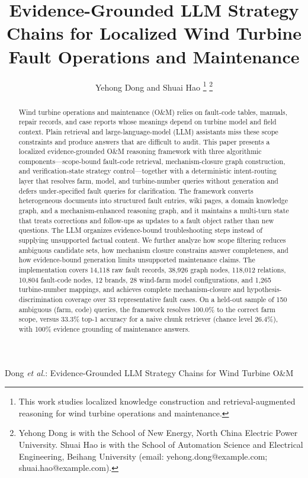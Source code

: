 \documentclass[lettersize,journal]{IEEEtran}
\begin{document}
\title{Evidence-Grounded LLM Strategy Chains for Localized Wind Turbine Fault Operations and Maintenance}

\author{Yehong Dong
        and Shuai Hao
\thanks{This work studies localized knowledge construction and retrieval-augmented reasoning for wind turbine operations and maintenance.}
\thanks{Yehong Dong is with the School of New Energy, North China Electric Power University. Shuai Hao is with the School of Automation Science and Electrical Engineering, Beihang University (email: yehong.dong@example.com; shuai.hao@example.com).}}

%
{Dong \MakeLowercase{\textit{et al.}}: Evidence-Grounded LLM Strategy Chains for Wind Turbine O\&M}

\maketitle

\begin{abstract}
Wind turbine operations and maintenance (O\&M) relies on fault-code tables, manuals, repair records, and case reports whose meanings depend on turbine model and field context. Plain retrieval and large-language-model (LLM) assistants miss these scope constraints and produce answers that are difficult to audit. This paper presents a localized evidence-grounded O\&M reasoning framework with three algorithmic components---scope-bound fault-code retrieval, mechanism-closure graph construction, and verification-state strategy control---together with a deterministic intent-routing layer that resolves farm, model, and turbine-number queries without generation and defers under-specified fault queries for clarification. The framework converts heterogeneous documents into structured fault entries, wiki pages, a domain knowledge graph, and a mechanism-enhanced reasoning graph, and it maintains a multi-turn state that treats corrections and follow-ups as updates to a fault object rather than new questions. The LLM organizes evidence-bound troubleshooting steps instead of supplying unsupported factual content. We further analyze how scope filtering reduces ambiguous candidate sets, how mechanism closure constrains answer completeness, and how evidence-bound generation limits unsupported maintenance claims. The implementation covers 14,118 raw fault records, 38,926 graph nodes, 118,012 relations, 10,804 fault-code nodes, 12 brands, 28 wind-farm model configurations, and 1,265 turbine-number mappings, and achieves complete mechanism-closure and hypothesis-discrimination coverage over 33 representative fault cases. On a held-out sample of 150 ambiguous (farm, code) queries, the framework resolves 100.0\% to the correct farm scope, versus 33.3\% top-1 accuracy for a naive chunk retriever (chance level 26.4\%), with 100\% evidence grounding of maintenance answers.
\end{abstract}
\end{document}
